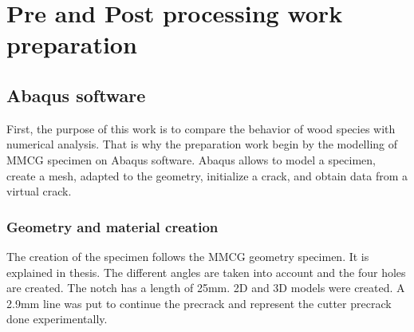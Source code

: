 \chapter{Pre and Post processing work preparation}
\label{Pre and Post processing work preparation}



\section{Abaqus software}

First, the purpose of this work is to compare the behavior of wood species with numerical analysis. That is why the preparation work begin by the modelling of MMCG specimen on Abaqus software. Abaqus allows to model a specimen, create a mesh, adapted to the geometry, initialize a crack, and obtain data from a virtual crack.


\subsection{Geometry and material creation}

The creation of the specimen follows the MMCG geometry specimen. It is explained in \parencite{Reference7} thesis. The different angles are taken into account and the four holes are created. The notch has a length of 25\si{\milli\meter}. 2D and 3D models were created. A 2.9\si{\milli\meter} line was put to continue the precrack and represent the cutter precrack done experimentally. 

